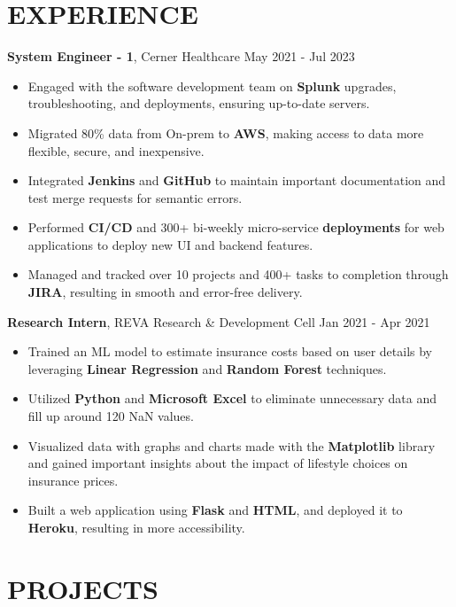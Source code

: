 \documentclass[a4paper,9pt]{extarticle}
\begin{document}
\section*{EXPERIENCE}
\noindent
\textbf{System Engineer - 1}, Cerner Healthcare
\hfill May 2021 - Jul 2023 %
\begin{itemize}
    \item Engaged with the software development team on \textbf{Splunk} upgrades, troubleshooting, and deployments, ensuring up-to-date servers.
    \item Migrated 80\% data from On-prem to \textbf{AWS}, making access to data more flexible, secure, and inexpensive.
    \item Integrated \textbf{Jenkins} and \textbf{GitHub} to maintain important documentation and test merge requests for semantic errors.
    \item Performed \textbf{CI/CD} and 300+ bi-weekly micro-service \textbf{deployments} for web applications to deploy new UI and backend features.
    \item Managed and tracked over 10 projects and 400+ tasks to completion through \textbf{JIRA}, resulting in smooth and error-free delivery. 
\end{itemize}
\noindent
\textbf{Research Intern}, REVA Research \& Development Cell
\hfill Jan 2021 - Apr 2021 %
\begin{itemize}
    \item Trained an ML model to estimate insurance costs based on user details by leveraging \textbf{Linear Regression} and \textbf{Random Forest} techniques.
    \item Utilized \textbf{Python} and \textbf{Microsoft Excel} to eliminate unnecessary data and fill up around 120 NaN values. 
    \item Visualized data with graphs and charts made with the \textbf{Matplotlib} library and gained important insights about the impact of lifestyle choices on insurance prices.
    \item Built a web application using \textbf{Flask} and \textbf{HTML}, and deployed it to \textbf{Heroku}, resulting in more accessibility.
\end{itemize}

\section*{PROJECTS}
\end{document}
